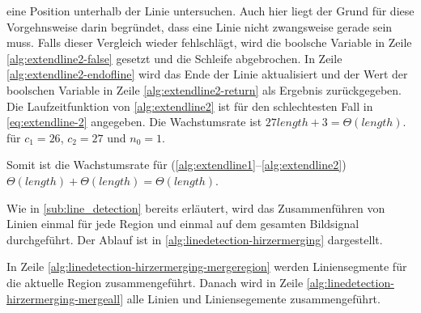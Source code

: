 eine Position unterhalb der Linie untersuchen. Auch hier liegt der Grund für diese Vorgehnsweise darin begründet, dass
 eine Linie nicht zwangsweise gerade sein muss. Falls dieser Vergleich wieder fehlschlägt, wird die boolsche Variable
 in Zeile \ref{alg:extendline2-false} gesetzt und die Schleife abgebrochen. In Zeile
 \ref{alg:extendline2-endofline} wird das Ende der Linie aktualisiert und der Wert der boolschen Variable in Zeile
 \ref{alg:extendline2-return} als Ergebnis zurückgegeben. Die Laufzeitfunktion von \autoref{alg:extendline2} ist für
 den schlechtesten Fall in \autoref{eq:extendline-2} angegeben. Die Wachstumsrate ist
 $27 \mathit{length} + 3 = \Theta(\mathit{length})$. für $c_{1} = 26$, $c_{2} = 27$ und $n_{0} = 1$.

Somit ist die Wachstumsrate für  (\autoref{alg:extendline1}--\autoref{alg:extendline2})
 $\Theta(\mathit{length}) + \Theta(\mathit{length}) = \Theta(\mathit{length})$.

Wie in \autoref{sub:line_detection} bereits erläutert, wird das Zusammenführen von Linien einmal für jede Region und
 einmal auf dem gesamten Bildsignal durchgeführt. Der Ablauf ist in \autoref{alg:linedetection-hirzermerging}
 dargestellt.



In Zeile \ref{alg:linedetection-hirzermerging-mergeregion} werden Liniensegmente für die aktuelle Region
 zusammengeführt. Danach wird in Zeile \ref{alg:linedetection-hirzermerging-mergeall} alle Linien und Liniensegemente zusammengeführt.
